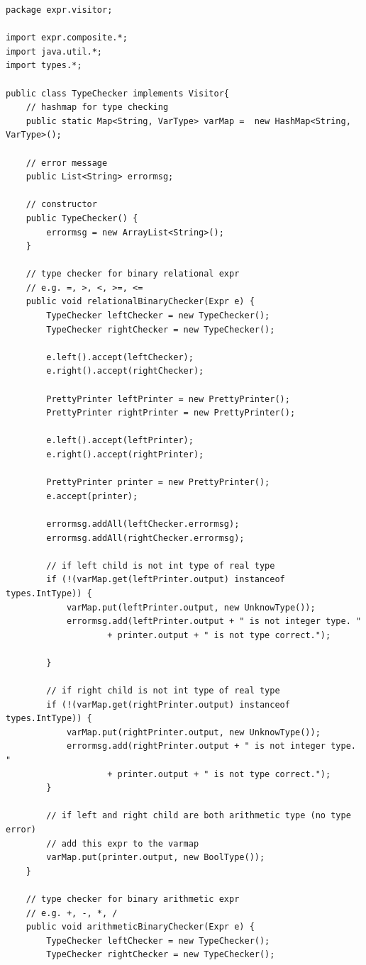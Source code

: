 \documentclass[a4paper,12pt,titlepage]{article}
\begin{document}
\begin{lstlisting}
package expr.visitor;

import expr.composite.*;
import java.util.*;
import types.*;

public class TypeChecker implements Visitor{
	// hashmap for type checking
	public static Map<String, VarType> varMap =  new HashMap<String, VarType>();
	
	// error message
	public List<String> errormsg;
	
	// constructor
	public TypeChecker() {
		errormsg = new ArrayList<String>();
	}
	
	// type checker for binary relational expr
	// e.g. =, >, <, >=, <=
	public void relationalBinaryChecker(Expr e) {
		TypeChecker leftChecker = new TypeChecker();
		TypeChecker rightChecker = new TypeChecker();
		
		e.left().accept(leftChecker);
		e.right().accept(rightChecker);
		
		PrettyPrinter leftPrinter = new PrettyPrinter();
		PrettyPrinter rightPrinter = new PrettyPrinter();
		
		e.left().accept(leftPrinter);
		e.right().accept(rightPrinter);
		
		PrettyPrinter printer = new PrettyPrinter();
		e.accept(printer);
		
		errormsg.addAll(leftChecker.errormsg);
		errormsg.addAll(rightChecker.errormsg);
		
		// if left child is not int type of real type
		if (!(varMap.get(leftPrinter.output) instanceof types.IntType)) {
			varMap.put(leftPrinter.output, new UnknowType());
			errormsg.add(leftPrinter.output + " is not integer type. " 
					+ printer.output + " is not type correct.");
			
		}
		
		// if right child is not int type of real type
		if (!(varMap.get(rightPrinter.output) instanceof types.IntType)) {
			varMap.put(rightPrinter.output, new UnknowType());
			errormsg.add(rightPrinter.output + " is not integer type. "
					+ printer.output + " is not type correct.");
		}
		
		// if left and right child are both arithmetic type (no type error)
		// add this expr to the varmap
		varMap.put(printer.output, new BoolType());
	}
	
	// type checker for binary arithmetic expr
	// e.g. +, -, *, /
	public void arithmeticBinaryChecker(Expr e) {
		TypeChecker leftChecker = new TypeChecker();
		TypeChecker rightChecker = new TypeChecker();
		

\end{lstlisting}
\end{document}
